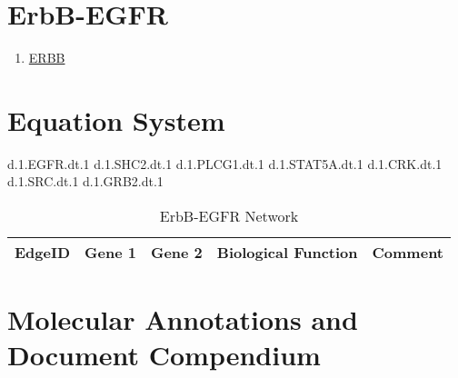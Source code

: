
\section{ErbB-EGFR}

\begin{enumerate}
\item \href{https://www.genome.jp/kegg-bin/show_pathway?map=hsa04012&show_description=show}{ERBB}

\end{enumerate}

\section{Equation System}

d.1.EGFR.dt.1 
d.1.SHC2.dt.1 
d.1.PLCG1.dt.1 
d.1.STAT5A.dt.1 
d.1.CRK.dt.1 
d.1.SRC.dt.1 
d.1.GRB2.dt.1  


\begin{table}[H]
	\tiny
	\begin{tabular}{p{1cm}p{1cm}p{3cm}p{1cm}p{1cm}} 
		EdgeID & Gene 1 & Gene 2 & Biological Function & Comment \\
		\hline
    
    \end{tabular}
	\caption{ErbB-EGFR Network}
	\label{tab:Table2}
\end{table}


\section{Molecular Annotations and Document Compendium}

